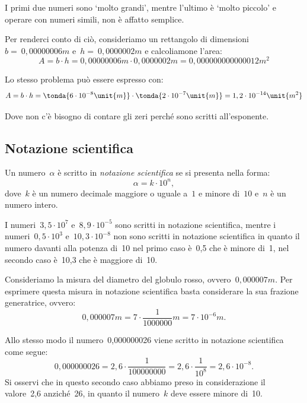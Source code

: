 I primi due numeri sono `molto grandi', mentre l'ultimo è `molto piccolo' e 
operare con numeri simili, non è affatto semplice.

Per renderci conto di ciò, consideriamo un rettangolo di dimensioni
\(b =~0,00000006\unit{m}\) e~\(h =~0,0000002\unit{m}\) e calcoliamone l'area:
\[A=b\cdot h=0,00000006\unit{m}\cdot0,0000002\unit{m}=
0,000000000000012\unit{m^2}\]

\begin{center}
\rett
% 
\end{center}

Lo stesso problema può essere espresso con:
\[A=b\cdot h=\tonda{6 \cdot 10^{-8}\unit{m}} \cdot
\tonda{2 \cdot 10^{-7}\unit{m}}=
1,2\cdot 10^{-14}\unit{m^2}\]

Dove non c'è bisogno di contare gli zeri perché sono scritti all'esponente.

\subsection{Notazione scientifica}
\begin{definizione}{}{}
Un numero~\(\alpha\) è scritto in \emph{notazione scientifica} se
si presenta nella forma:
\[\alpha=k\cdot10^n,\] 
dove~\(k\) è un numero decimale maggiore o uguale a~\(1\) e minore di~\(10\) 
e~\(n\) è un numero intero.
\end{definizione}

 \begin{esempio}{}{}
I numeri~\(3,5\cdot10^7\) e~\(8,9\cdot10^{-5}\) sono scritti in notazione 
scientifica, mentre i numeri~\(0,5\cdot10^3\) e~\(10,3\cdot 10^{-8}\) non 
sono scritti in notazione scientifica in quanto il numero davanti alla 
potenza di~10 nel primo caso è~0,5 che è minore di~1, nel secondo caso è~10,3 
che è maggiore di~10.
 \end{esempio}

Consideriamo la misura del diametro del globulo rosso, 
ovvero~\(0,000007\unit{m}\).
Per esprimere questa misura in notazione scientifica basta considerare la 
sua 
frazione generatrice, ovvero:
\[0,000007\unit{m}=7\cdot\frac{1}{1000000}\unit{m}=7\cdot10^{-6}\unit{m}.\]

Allo stesso modo il numero~0,000000026 viene scritto in notazione 
scientifica 
come segue:
\[0,000000026=2,6\cdot\frac{1}{100000000}=2,6\cdot\frac{1}{10^8}=2,6\cdot10^
{-8}.\]
Si osservi che in questo secondo caso abbiamo preso in considerazione il 
valore~2,6 anziché~26, in quanto il numero~\(k\) deve essere minore di~10.

